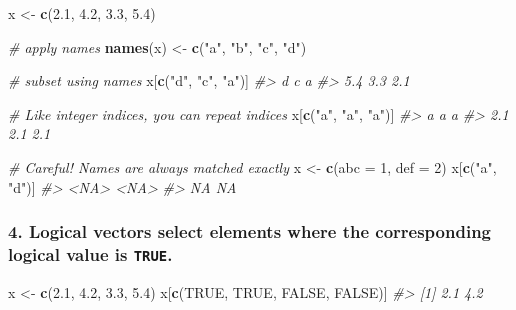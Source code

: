 \documentclass[]{book}
\newenvironment{Shaded}{\begin{snugshade}}{\end{snugshade}}
\newcommand{\KeywordTok}[1]{\textcolor[rgb]{0.13,0.29,0.53}{\textbf{#1}}}
\newcommand{\DataTypeTok}[1]{\textcolor[rgb]{0.13,0.29,0.53}{#1}}
\newcommand{\DecValTok}[1]{\textcolor[rgb]{0.00,0.00,0.81}{#1}}
\newcommand{\FloatTok}[1]{\textcolor[rgb]{0.00,0.00,0.81}{#1}}
\newcommand{\StringTok}[1]{\textcolor[rgb]{0.31,0.60,0.02}{#1}}
\newcommand{\CommentTok}[1]{\textcolor[rgb]{0.56,0.35,0.01}{\textit{#1}}}
\newcommand{\OtherTok}[1]{\textcolor[rgb]{0.56,0.35,0.01}{#1}}
\newcommand{\NormalTok}[1]{#1}
\begin{document}
\begin{Shaded}
\begin{Highlighting}[]
\NormalTok{x <-}\StringTok{ }\KeywordTok{c}\NormalTok{(}\FloatTok{2.1}\NormalTok{, }\FloatTok{4.2}\NormalTok{, }\FloatTok{3.3}\NormalTok{, }\FloatTok{5.4}\NormalTok{)}

\CommentTok{# apply names}
\KeywordTok{names}\NormalTok{(x) <-}\StringTok{ }\KeywordTok{c}\NormalTok{(}\StringTok{"a"}\NormalTok{, }\StringTok{"b"}\NormalTok{, }\StringTok{"c"}\NormalTok{, }\StringTok{"d"}\NormalTok{)}

\CommentTok{# subset using names}
\NormalTok{x[}\KeywordTok{c}\NormalTok{(}\StringTok{"d"}\NormalTok{, }\StringTok{"c"}\NormalTok{, }\StringTok{"a"}\NormalTok{)]}
\CommentTok{#>   d   c   a }
\CommentTok{#> 5.4 3.3 2.1}

\CommentTok{# Like integer indices, you can repeat indices}
\NormalTok{x[}\KeywordTok{c}\NormalTok{(}\StringTok{"a"}\NormalTok{, }\StringTok{"a"}\NormalTok{, }\StringTok{"a"}\NormalTok{)]}
\CommentTok{#>   a   a   a }
\CommentTok{#> 2.1 2.1 2.1}

\CommentTok{# Careful! Names are always matched exactly}
\NormalTok{x <-}\StringTok{ }\KeywordTok{c}\NormalTok{(}\DataTypeTok{abc =} \DecValTok{1}\NormalTok{, }\DataTypeTok{def =} \DecValTok{2}\NormalTok{)}
\NormalTok{x[}\KeywordTok{c}\NormalTok{(}\StringTok{"a"}\NormalTok{, }\StringTok{"d"}\NormalTok{)]}
\CommentTok{#> <NA> <NA> }
\CommentTok{#>   NA   NA}
\end{Highlighting}
\end{Shaded}

\subsubsection*{\texorpdfstring{4. \textbf{Logical vectors} select
elements where the corresponding logical value is
\texttt{TRUE}.}{4. Logical vectors select elements where the corresponding logical value is TRUE.}}\label{logical-vectors-select-elements-where-the-corresponding-logical-value-is-true.}

\begin{Shaded}
\begin{Highlighting}[]
\NormalTok{x <-}\StringTok{ }\KeywordTok{c}\NormalTok{(}\FloatTok{2.1}\NormalTok{, }\FloatTok{4.2}\NormalTok{, }\FloatTok{3.3}\NormalTok{, }\FloatTok{5.4}\NormalTok{)}
\NormalTok{x[}\KeywordTok{c}\NormalTok{(}\OtherTok{TRUE}\NormalTok{, }\OtherTok{TRUE}\NormalTok{, }\OtherTok{FALSE}\NormalTok{, }\OtherTok{FALSE}\NormalTok{)]}
\CommentTok{#> [1] 2.1 4.2}
\end{Highlighting}
\end{Shaded}
\end{document}
